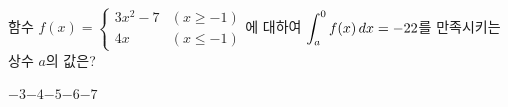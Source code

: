 함수 $f(x)=\begin{cases} 3x^2-7 & (x\ge -1) \\ 4x & (x\le -1) \end{cases}$에 대하여 $\displaystyle\int_{a}^{0}f(x)\mkern3mu dx=-22$를 만족시키는 상수 $a$의 값은? 
\begin{choices32}{$-3$}{$-4$}{$-5$}{$-6$}{$-7$}\end{choices32}

